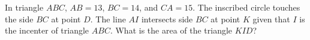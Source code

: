 In triangle $ABC$, $AB=13$, $BC=14$, and $CA=15$. The inscribed circle touches the side $BC$ at point $D$. The line $AI$ intersects side $BC$ at point $K$ given that $I$ is the incenter of triangle $ABC$. What is the area of the triangle $KID$?
